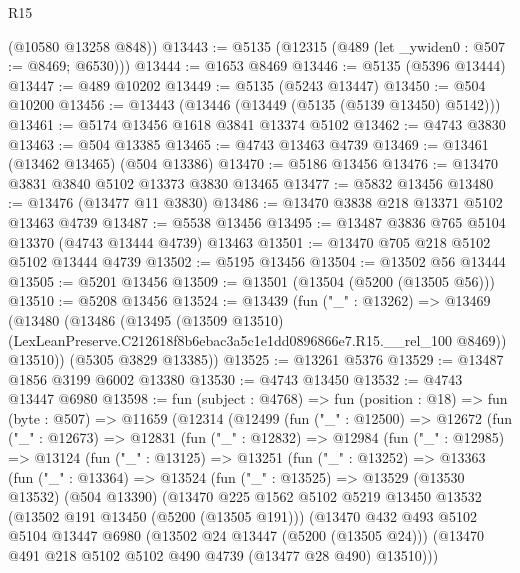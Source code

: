 \begin{lexlean}{R15}
\begin{coremodule}
{{{{{{{{{{{      (@10580 @13258 @848))
@13443 := @5135 (@12315 (@489 (let _ywiden0 : @507 := @8469; @6530)))
@13444 := @1653 @8469
@13446 := @5135 (@5396 @13444)
@13447 := @489 @10202
@13449 := @5135 (@5243 @13447)
@13450 := @504 @10200
@13456 := @13443 (@13446 (@13449 (@5135 (@5139 @13450) @5142)))
@13461 := @5174 @13456 @1618 @3841 @13374 @5102
@13462 := @4743 @3830
@13463 := @504 @13385
@13465 := @4743 @13463 @4739
@13469 := @13461 (@13462 @13465) (@504 @13386)
@13470 := @5186 @13456
@13476 := @13470 @3831 @3840 @5102 @13373 @3830 @13465
@13477 := @5832 @13456
@13480 := @13476 (@13477 @11 @3830)
@13486 := @13470 @3838 @218 @13371 @5102 @13463 @4739
@13487 := @5538 @13456
@13495 := @13487 @3836 @765 @5104 @13370 (@4743 @13444 @4739) @13463
@13501 := @13470 @705 @218 @5102 @5102 @13444 @4739
@13502 := @5195 @13456
@13504 := @13502 @56 @13444
@13505 := @5201 @13456
@13509 := @13501 (@13504 (@5200 (@13505 @56)))
@13510 := @5208 @13456
@13524 := @13439
    (fun ("_" : @13262) =>
    @13469
      (@13480
        (@13486
          (@13495
            (@13509 @13510)
            (LexLeanPreserve.C212618f8b6ebac3a5c1e1dd0896866e7.R15.__rel_100 @8469))
          @13510))
      (@5305 @3829 @13385))
@13525 := @13261 @5376
@13529 := @13487 @1856 @3199 @6002 @13380
@13530 := @4743 @13450
@13532 := @4743 @13447 @6980
@13598 := fun (subject : @4768) =>
  fun (position : @18) =>
  fun (byte : @507) =>
  @11659
    (@12314
      (@12499
        (fun ("_" : @12500) =>
        @12672
          (fun ("_" : @12673) =>
          @12831
            (fun ("_" : @12832) =>
            @12984
              (fun ("_" : @12985) =>
              @13124
                (fun ("_" : @13125) =>
                @13251
                  (fun ("_" : @13252) =>
                  @13363
                    (fun ("_" : @13364) =>
                    @13524
                      (fun ("_" : @13525) =>
                      @13529
                        (@13530 @13532)
                        (@504 @13390)
                        (@13470
                          @225
                          @1562
                          @5102
                          @5219
                          @13450
                          @13532
                          (@13502 @191 @13450 (@5200 (@13505 @191)))
                          (@13470
                            @432
                            @493
                            @5102
                            @5104
                            @13447
                            @6980
                            (@13502 @24 @13447 (@5200 (@13505 @24)))
                            (@13470 @491 @218 @5102 @5102 @490 @4739 (@13477 @28 @490) @13510)))
}}}}}}}}}}}
\end{coremodule}
\end{lexlean}
